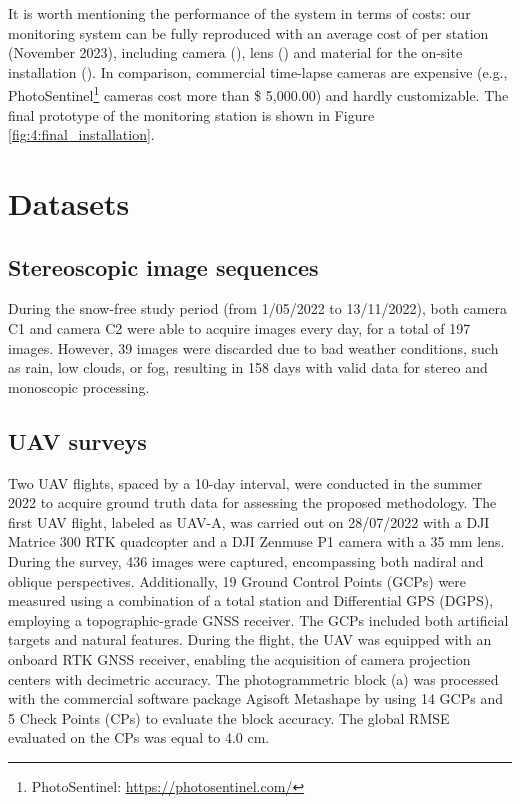 It is worth mentioning the performance of the system in terms of costs: our monitoring system can be fully reproduced with an average cost of  per station (November 2023), including camera (), lens () and material for the on-site installation ().
In comparison, commercial time-lapse cameras are expensive
(e.g., PhotoSentinel\footnote{PhotoSentinel: \url{https://photosentinel.com/}} cameras cost more than \$ 5,000.00) and hardly customizable.
The final prototype of the monitoring station is shown in Figure
\ref{fig:4:final_installation}.

\section{Datasets}\label{sec:4:datasets}

\subsection{Stereoscopic image sequences}\label{sec:4:stereo}

During the snow-free study period (from 1/05/2022 to 13/11/2022), both camera C1 and
camera C2 were able to acquire images every day, for a total of 197 images. However, 39
images were discarded due to bad weather conditions, such as rain, low clouds, or fog,
resulting in 158 days with valid data for stereo and monoscopic processing.

\subsection{UAV surveys}\label{sec:4:uavsurveys}

Two UAV flights, spaced by a 10-day interval, were conducted in the summer 2022 to acquire
ground truth data for assessing the proposed methodology.
The first UAV flight, labeled as UAV-A, was carried out on 28/07/2022 with a DJI
Matrice 300 RTK quadcopter and a DJI Zenmuse P1 camera with a 35 mm lens.
During the survey, 436 images were captured, encompassing both nadiral and oblique
perspectives.
Additionally, 19 Ground Control Points (GCPs) were measured using a combination of a
total station and Differential GPS (DGPS), employing a topographic-grade
GNSS receiver.
The GCPs included both artificial targets and natural features.
During the flight, the UAV was equipped with an onboard RTK GNSS receiver, enabling the
acquisition of camera projection centers with decimetric accuracy.
The photogrammetric block (a) was processed with the commercial
software package Agisoft Metashape \citep{agisoft} by using 14 GCPs and 5 Check Points
(CPs) to evaluate the block accuracy.
The global RMSE evaluated on the CPs was equal to 4.0 cm.

